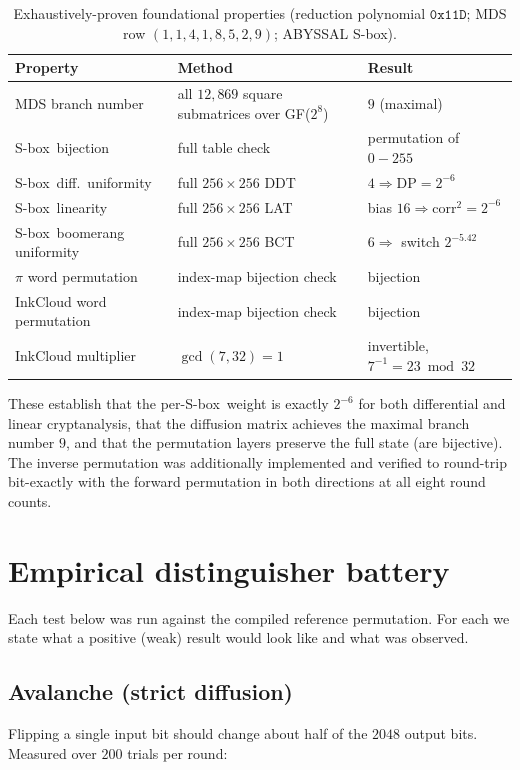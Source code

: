 \documentclass[11pt]{article}
\newcommand{\sbx}{S\nobreakdash-box}
\begin{document}
\begin{table}[h]
\centering
\begin{tabular}{lll}
  \toprule
  \textbf{Property} & \textbf{Method} & \textbf{Result} \\
  \midrule
  MDS branch number & all $12{,}869$ square submatrices over GF($2^8$) & $9$ (maximal) \\
  \sbx\ bijection & full table check & permutation of $0\!-\!255$ \\
  \sbx\ diff.\ uniformity & full $256\times256$ DDT & $4 \Rightarrow \mathrm{DP}=2^{-6}$ \\
  \sbx\ linearity & full $256\times256$ LAT & bias $16 \Rightarrow \mathrm{corr}^2=2^{-6}$ \\
  \sbx\ boomerang uniformity & full $256\times256$ BCT & $6 \Rightarrow$ switch $2^{-5.42}$ \\
  $\pi$ word permutation & index-map bijection check & bijection \\
  InkCloud word permutation & index-map bijection check & bijection \\
  InkCloud multiplier & $\gcd(7,32)=1$ & invertible, $7^{-1}=23 \bmod 32$ \\
  \bottomrule
\end{tabular}
\caption{Exhaustively-proven foundational properties (reduction polynomial
$\mathtt{0x11D}$; MDS row $(1,1,4,1,8,5,2,9)$; ABYSSAL \sbx).}
\end{table}

These establish that the per-\sbx\ weight is exactly $2^{-6}$ for both
differential and linear cryptanalysis, that the diffusion matrix achieves the
maximal branch number $9$, and that the permutation layers preserve the full
state (are bijective). The inverse permutation was additionally implemented and
verified to round-trip bit-exactly with the forward permutation in both
directions at all eight round counts.

\section{Empirical distinguisher battery}

Each test below was run against the compiled reference permutation. For each we
state what a positive (weak) result would look like and what was observed.

\subsection{Avalanche (strict diffusion)}
Flipping a single input bit should change about half of the $2048$ output bits.
Measured over $200$ trials per round:
\end{document}
